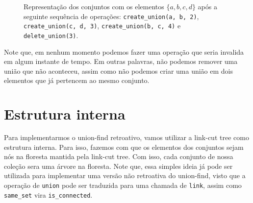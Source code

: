 \begin{figure}[h!]
\begin{subfigure}{\textwidth}
        \bigskip
    \end{subfigure}
    \begin{subfigure}{\textwidth}
        \centering
    \end{subfigure}
    \caption{Representação dos conjuntos com os elementos $\{a,b,c,d\}$ após a seguinte sequência de operações: \texttt{create\_union(a, b, 2)}, \texttt{create\_union(c, d, 3)}, \texttt{create\_union(b, c, 4)} e \texttt{delete\_union(3)}.}
    \label{fig:uf-sets}
\end{figure}

Note que, em nenhum momento podemos fazer uma operação que seria invalida em algum instante de tempo. Em outras palavras, não podemos remover uma união que não aconteceu, assim como não podemos criar uma união em dois elementos que já pertencem ao mesmo conjunto.

\section{Estrutura interna}
\label{sec:uf-estrutura}

Para implementarmos o union-find retroativo, vamos utilizar a link-cut tree como estrutura interna. Para isso, fazemos com que os elementos dos conjuntos sejam nós na floresta mantida pela link-cut tree. Com isso, cada conjunto de nossa coleção sera uma árvore na floresta. Note que, essa simples ideia já pode ser utilizada para implementar uma versão não retroativa do union-find, visto que a operação de \texttt{union} pode ser traduzida para uma chamada de \texttt{link}, assim como \texttt{same\_set} vira \texttt{is\_connected}.

